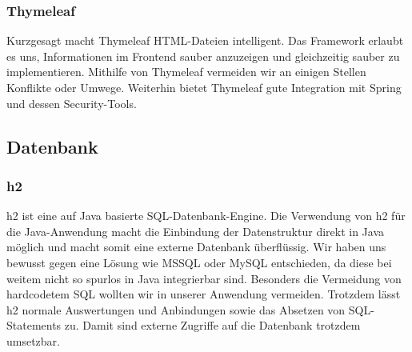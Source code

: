 \subsubsection{Thymeleaf}
Kurzgesagt macht Thymeleaf HTML-Dateien intelligent. Das Framework erlaubt es uns, Informationen im Frontend sauber anzuzeigen und gleichzeitig sauber zu implementieren. Mithilfe von Thymeleaf vermeiden wir an einigen Stellen Konflikte oder Umwege. Weiterhin bietet Thymeleaf gute Integration mit Spring und dessen Security-Tools.

\subsection{Datenbank}

\subsubsection{h2}
h2 ist eine auf Java basierte SQL-Datenbank-Engine. Die Verwendung von h2 für die Java-Anwendung macht die Einbindung der Datenstruktur direkt in Java möglich und macht somit eine externe Datenbank überflüssig. Wir haben uns bewusst gegen eine Lösung wie MSSQL oder MySQL entschieden, da diese bei weitem nicht so spurlos in Java integrierbar sind. Besonders die Vermeidung von hardcodetem SQL wollten wir in unserer Anwendung vermeiden. Trotzdem lässt h2 normale Auswertungen und Anbindungen sowie das Absetzen von SQL-Statements zu. Damit sind externe Zugriffe auf die Datenbank trotzdem umsetzbar.
%
%
